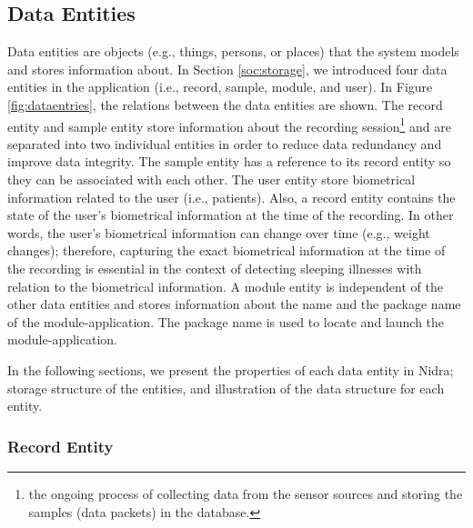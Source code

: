 \subsection{Data Entities}
Data entities are objects (e.g., things, persons, or places) that the system models and stores information about. In Section \ref{soc:storage}, we introduced four data entities in the application (i.e., record, sample, module, and user). In Figure \ref{fig:dataentries}, the relations between the data entities are shown. The record entity and sample entity store information about the recording session\footnote{the ongoing process of collecting data from the sensor sources and storing the samples (data packets) in the database.} and are separated into two individual entities in order to reduce data redundancy and improve data integrity. The sample entity has a reference to its record entity so they can be associated with each other. The user entity store biometrical information related to the user (i.e., patients). Also, a record entity contains the state of the user's biometrical information at the time of the recording. In other words, the user's biometrical information can change over time (e.g.,  weight changes); therefore, capturing the exact biometrical information at the time of the recording is essential in the context of detecting sleeping illnesses with relation to the biometrical information.  A module entity is independent of the other data entities and stores information about the name and the package name of the module-application. The package name is used to locate and launch the module-application. 

In the following sections, we present the properties of each data entity in Nidra; storage structure of the entities, and illustration of the data structure for each entity.  



\subsubsection{Record Entity} \label{ssec:record}

